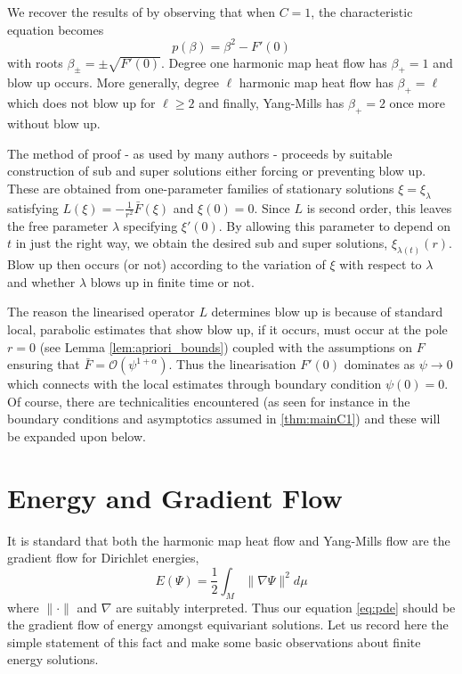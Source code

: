 \documentclass{amsart}
\begin{document}
\begin{rem}
We recover the results of \cite{MR2332425} by observing that when \(C = 1\), the characteristic equation becomes
\[
p(\beta) = \beta^2 - F'(0)
\]
with roots \(\beta_{\pm} = \pm \sqrt{F'(0)}\). Degree one harmonic map heat flow has \(\beta_+ = 1\) and blow up occurs. More generally, degree \(\ell\) harmonic map heat flow has \(\beta_+ = \ell\) which does not blow up for \(\ell \geq 2\) and finally, Yang-Mills has \(\beta_+ = 2\) once more without blow up.
\end{rem}

The method of proof - as used by many authors \cite{MR2332425,MR1180392} - proceeds by suitable construction of sub and super solutions either forcing or preventing blow up. These are obtained from one-parameter families of stationary solutions \(\xi = \xi_{\lambda}\) satisfying \(L(\xi) = -\tfrac{1}{r^2} \bar{F} (\xi)\) and \(\xi(0) = 0\). Since \(L\) is second order, this leaves the free parameter \(\lambda\) specifying \(\xi'(0)\). By allowing this parameter to depend on \(t\) in just the right way, we obtain the desired sub and super solutions, \(\xi_{\lambda(t)} (r)\). Blow up then occurs (or not) according to the variation of \(\xi\) with respect to \(\lambda\) and whether \(\lambda\) blows up in finite time or not.

The reason the linearised operator \(L\) determines blow up is because of standard local, parabolic estimates that show blow up, if it occurs, must occur at the pole \(r = 0\) (see Lemma \ref{lem:apriori_bounds}) coupled with the assumptions on \(F\) ensuring that \(\bar{F} = \mathcal{O}(\psi^{1+\alpha})\). Thus the linearisation \(F'(0)\) dominates as \(\psi \to 0\) which connects with the local estimates through boundary condition \(\psi(0) = 0\). Of course, there are technicalities encountered (as seen for instance in the boundary conditions and asymptotics assumed in \cref{thm:mainC1}) and these will be expanded upon below.

\section{Energy and Gradient Flow}
\label{subsec:intro_energygradient}

It is standard that both the harmonic map heat flow and Yang-Mills flow are the gradient flow for Dirichlet energies,
\[
E(\Psi) = \frac{1}{2} \int_M \|\nabla \Psi\|^2 d\mu
\]
where \(\|\cdot\|\) and \(\nabla\) are suitably interpreted. Thus our equation \eqref{eq:pde} should be the gradient flow of energy amongst equivariant solutions. Let us record here the simple statement of this fact and make some basic observations about finite energy solutions.
\end{document}
